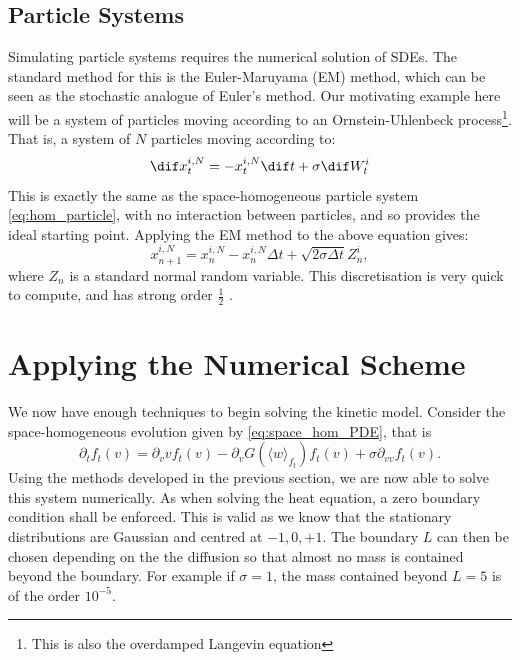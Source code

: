 \documentclass[11pt, a4paper, draft]{article}
\newcommand{\Dt}{\Delta t}
\begin{document}
        \subsection{Particle Systems}
            Simulating particle systems requires the numerical solution of SDEs. The standard method for this is the Euler-Maruyama (EM) method, which can be seen as the stochastic analogue of Euler's method. Our motivating example here will be a system of particles moving according to an Ornstein-Uhlenbeck process\footnote{This is also the overdamped Langevin equation}. That is, a system of $N$ particles moving according to:
            \begin{equation}
                \dif x^{i,N}_t = - x^{i,N}_t \dif t + \sigma \dif W^i_t
            \end{equation}
            This is exactly the same as the space-homogeneous particle system \eqref{eq:hom_particle}, with no interaction between particles, and so provides the ideal starting point. Applying the EM method to the above equation gives:
            \[ x^{i,N}_{n+1} = x^{i,N}_n -  x^{i,N}_n\Dt + \sqrt{2\sigma\Dt}Z^i_n,  \]
		    where $Z_n$ is a standard normal random variable. This discretisation is very quick to compute, and has strong order $\frac{1}{2}$ \cite{Higham01}.
		\section{Applying the Numerical Scheme}
			We now have enough techniques to begin solving the kinetic model. Consider the space-homogeneous evolution given by \eqref{eq:space_hom_PDE}, that is
			\begin{equation}
				\partial_t f_t(v) = \partial_v vf_t(v) - \partial_v G(\langle w \rangle_{f_t})f_t(v) + \sigma \partial_{vv} f_t(v).
			\end{equation}
            Using the methods developed in the previous section, we are now able to solve this system numerically. As when solving the heat equation, a zero boundary condition shall be enforced. This is valid as we know that the stationary distributions are Gaussian and centred at $-1,0,+1$. The boundary $L$ can then be chosen depending on the the diffusion so that almost no mass is contained beyond the boundary. For example if $\sigma = 1$, the mass contained beyond $L=5$ is of the order $10^{-5}$. 
            
\end{document}

